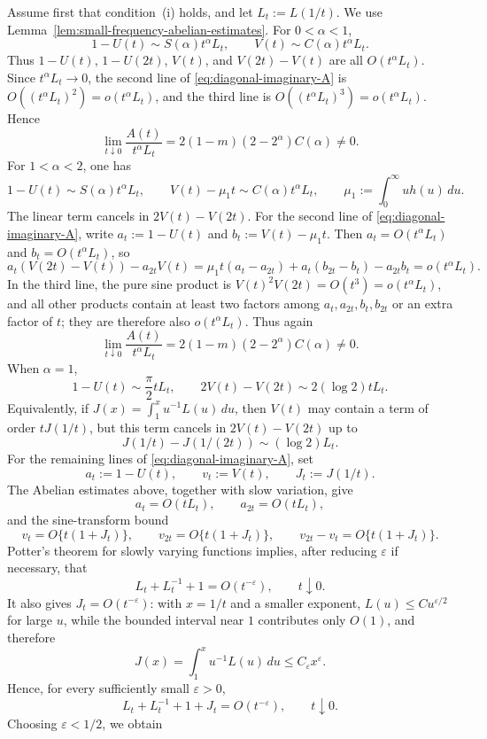 \documentclass[aap,press]{apt} \volno{00} \partno{00}
\newcommand{\1}{\mathbf{1}}
\numberwithin{equation}{section}
\begin{document}
Assume first that condition~(i) holds, and let $L_t:=L(1/t)$. We use Lemma~\ref{lem:small-frequency-abelian-estimates}. For $0<\alpha<1$,
\[
1-U(t)\sim S(\alpha)t^\alpha L_t,
\qquad
V(t)\sim C(\alpha)t^\alpha L_t.
\]
Thus $1-U(t)$, $1-U(2t)$, $V(t)$, and $V(2t)-V(t)$ are all $O(t^\alpha L_t)$. Since $t^\alpha L_t\to0$, the second line of \eqref{eq:diagonal-imaginary-A} is $O((t^\alpha L_t)^2)=o(t^\alpha L_t)$, and the third line is $O((t^\alpha L_t)^3)=o(t^\alpha L_t)$. Hence
\[
\lim_{t\downarrow0}\frac{A(t)}{t^\alpha L_t}
=2(1-m)(2-2^\alpha)C(\alpha)\neq0.
\]
For $1<\alpha<2$, one has
\[
1-U(t)\sim S(\alpha)t^\alpha L_t,
\qquad
V(t)-\mu_1t\sim C(\alpha)t^\alpha L_t,
\qquad
\mu_1:=\int_0^\infty u h(u)\,du.
\]
The linear term cancels in $2V(t)-V(2t)$. For the second line of \eqref{eq:diagonal-imaginary-A}, write $a_t:=1-U(t)$ and $b_t:=V(t)-\mu_1t$. Then $a_t=O(t^\alpha L_t)$ and $b_t=O(t^\alpha L_t)$, so
\[
a_t(V(2t)-V(t))-a_{2t}V(t)
=
\mu_1t(a_t-a_{2t})+a_t(b_{2t}-b_t)-a_{2t}b_t
=o(t^\alpha L_t).
\]
In the third line, the pure sine product is $V(t)^2V(2t)=O(t^3)=o(t^\alpha L_t)$, and all other products contain at least two factors among $a_t,a_{2t},b_t,b_{2t}$ or an extra factor of $t$; they are therefore also $o(t^\alpha L_t)$. Thus again
\[
\lim_{t\downarrow0}\frac{A(t)}{t^\alpha L_t}
=2(1-m)(2-2^\alpha)C(\alpha)\neq0.
\]
When $\alpha=1$,
\[
1-U(t)\sim \frac{\pi}{2}tL_t,
\qquad
2V(t)-V(2t)\sim 2(\log 2)tL_t.
\]
Equivalently, if $J(x)=\int_1^x u^{-1}L(u)\,du$, then $V(t)$ may contain a term of order $tJ(1/t)$, but this term cancels in $2V(t)-V(2t)$ up to
\[
J(1/t)-J(1/(2t))\sim(\log2)L_t.
\]
For the remaining lines of \eqref{eq:diagonal-imaginary-A}, set
\[
a_t:=1-U(t),\qquad v_t:=V(t),\qquad J_t:=J(1/t).
\]
The Abelian estimates above, together with slow variation, give
\[
a_t=O(tL_t),\qquad a_{2t}=O(tL_t),
\]
and the sine-transform bound
\[
v_t=O\{t(1+J_t)\},\qquad v_{2t}=O\{t(1+J_t)\},\qquad
v_{2t}-v_t=O\{t(1+J_t)\}.
\]
Potter's theorem for slowly varying functions \cite[Theorem~1.5.6(i), p.~25]{Bingham_Goldie_Teugels_1987} implies, after reducing $\varepsilon$ if necessary, that
\[
L_t+L_t^{-1}+1=O(t^{-\varepsilon}),\qquad t\downarrow0.
\]
It also gives $J_t=O(t^{-\varepsilon})$: with $x=1/t$ and a smaller exponent, $L(u)\le C u^{\varepsilon/2}$ for large $u$, while the bounded interval near $1$ contributes only $O(1)$, and therefore
\[
J(x)=\int_1^x u^{-1}L(u)\,du\le C_\varepsilon x^\varepsilon .
\]
Hence, for every sufficiently small $\varepsilon>0$,
\[
L_t+L_t^{-1}+1+J_t=O(t^{-\varepsilon}),\qquad t\downarrow0.
\]
Choosing $\varepsilon<1/2$, we obtain
\end{document}
